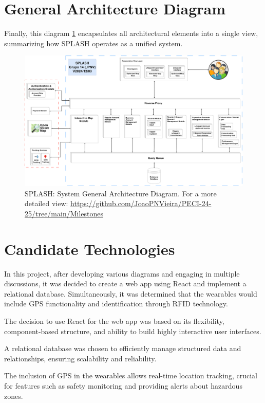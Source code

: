\newpage
\section{General Architecture Diagram}
Finally, this diagram \ref{fig:general_architecture} encapsulates all architectural elements into a single view, summarizing how SPLASH operates as a unified system.

\begin{figure}[H]
      \centering
      \includegraphics[width=16cm]{figs/general_architecture.png}
      \caption{SPLASH: System General Architecture Diagram. For a more detailed view: \url{https://github.com/JoaoPNVieira/PECI-24-25/tree/main/Milestones}}
      \label{fig:general_architecture}
\end{figure}

\section{Candidate Technologies}
\label{section:candidate_tech}
%
In this project, after developing various diagrams and engaging in multiple discussions, it was decided to create a web app using React and implement a relational database. Simultaneously, it was determined that the wearables would include GPS functionality and identification through RFID technology.

The decision to use React for the web app was based on its flexibility, component-based structure, and ability to build highly interactive user interfaces. 

A relational database was chosen to efficiently manage structured data and relationships, ensuring scalability and reliability.

The inclusion of GPS in the wearables allows real-time location tracking, crucial for features such as safety monitoring and providing alerts about hazardous zones. 

